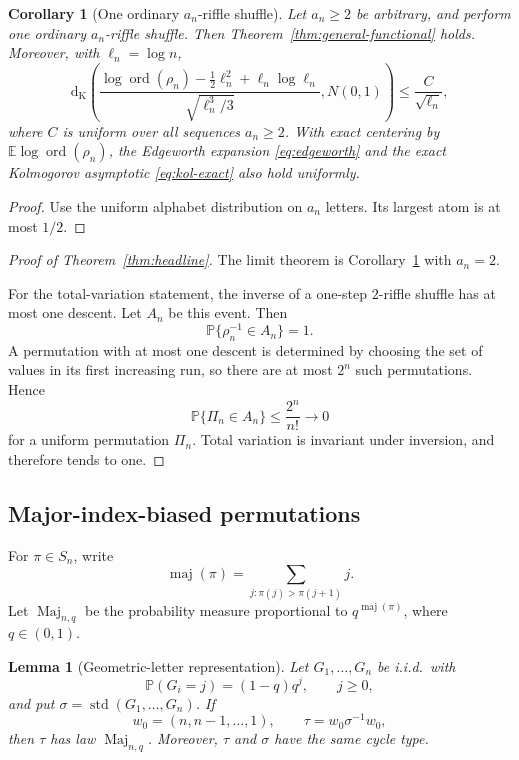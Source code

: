 \documentclass[11pt]{article}
\newtheorem{lemma}[theorem]{Lemma}
\newtheorem{corollary}[theorem]{Corollary}
\theoremstyle{definition}
\theoremstyle{remark}
\newcommand{\Pp}{\mathbb P}
\newcommand{\Ee}{\mathbb E}
\newcommand{\ord}{\operatorname{ord}}
\newcommand{\Kol}{\mathrm d_{\mathrm K}}
\begin{document}
\begin{corollary}[One ordinary $a_n$-riffle shuffle]
\label{cor:ordinary-riffle}
Let $a_n\ge2$ be arbitrary, and perform one ordinary $a_n$-riffle shuffle.
Then Theorem~\ref{thm:general-functional} holds.  Moreover, with
$\ell_n=\log n$,
\[
 \Kol\!\left(
 \frac{\log\ord(\rho_n)-\frac12\ell_n^2
       +\ell_n\log\ell_n}
      {\sqrt{\ell_n^3/3}},N(0,1)
 \right)
 \le \frac{C}{\sqrt{\ell_n}},
\]
where $C$ is uniform over all sequences $a_n\ge2$.  With exact
centering by $\Ee\log\ord(\rho_n)$, the Edgeworth expansion
\eqref{eq:edgeworth} and the exact Kolmogorov asymptotic
\eqref{eq:kol-exact} also hold uniformly.
\end{corollary}

\begin{proof}
Use the uniform alphabet distribution on $a_n$ letters.  Its largest atom
is at most $1/2$.
\end{proof}

\begin{proof}[Proof of Theorem~\ref{thm:headline}]
The limit theorem is Corollary~\ref{cor:ordinary-riffle} with $a_n=2$.

For the total-variation statement, the inverse of a one-step $2$-riffle
shuffle has at most one descent.  Let $A_n$ be this event.  Then
\[
 \Pp\{\rho_n^{-1}\in A_n\}=1.
\]
A permutation with at most one descent is determined by choosing the set
of values in its first increasing run, so there are at most $2^n$ such
permutations.  Hence
\[
 \Pp\{\Pi_n\in A_n\}\le\frac{2^n}{n!}\longrightarrow0
\]
for a uniform permutation $\Pi_n$.  Total variation is invariant under
inversion, and therefore tends to one.
\end{proof}

\subsection{Major-index-biased permutations}

For $\pi\in S_n$, write
\[
 \operatorname{maj}(\pi)
 =
 \sum_{j:\pi(j)>\pi(j+1)}j.
\]
Let $\operatorname{Maj}_{n,q}$ be the probability measure proportional to
$q^{\operatorname{maj}(\pi)}$, where $q\in(0,1)$.

\begin{lemma}[Geometric-letter representation]\label{lem:maj-representation}
Let $G_1,\ldots,G_n$ be i.i.d.\ with
\[
 \Pp(G_i=j)=(1-q)q^j,\qquad j\ge0,
\]
and put $\sigma=\operatorname{std}(G_1,\ldots,G_n)$.  If
\[
 w_0=(n,n-1,\ldots,1),
 \qquad
 \tau=w_0\sigma^{-1}w_0,
\]
then $\tau$ has law $\operatorname{Maj}_{n,q}$.  Moreover, $\tau$ and
$\sigma$ have the same cycle type.
\end{lemma}
\end{document}
